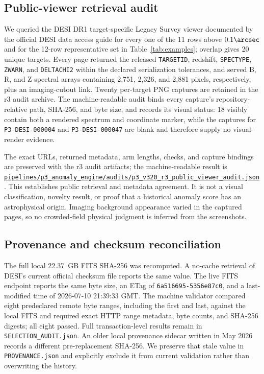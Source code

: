 \documentclass[twocolumn,linenumbers]{aastex702}
\newcommand{\repoBase}{https://github.com/Hubify-Projects/bigbounce/blob/main}
\newcommand{\artifact}[1]{\href{\repoBase/#1}{\nolinkurl{#1}}}
\begin{document}
\subsection{Public-viewer retrieval audit}\label{sec:viewer-audit}

We queried the DESI DR1 target-specific Legacy Survey viewer documented by the official DESI data
access guide for every one of the 11 rows above $0.1\arcsec$ and for the 12-row representative set
in Table~\ref{tab:examples}; overlap gives 20 unique targets.  Every page returned the released
\texttt{TARGETID}, redshift, \texttt{SPECTYPE}, \texttt{ZWARN}, and \texttt{DELTACHI2} within the
declared serialization tolerances, and served B, R, and Z spectral arrays containing 2,751,
2,326, and 2,881 pixels, respectively, plus an imaging-cutout link.  Twenty per-target PNG captures
are retained in the r3 audit archive.  The machine-readable audit binds every capture's repository-relative
path, SHA-256, and byte size, and records its visual status: 18 visibly contain both a rendered spectrum
and coordinate marker, while the captures for \texttt{P3-DESI-000004} and \texttt{P3-DESI-000047}
are blank and therefore supply no visual-render evidence.

The exact URLs, returned metadata, arm lengths, checks, and capture bindings are preserved with the r3
audit artifacts; the machine-readable result is
\artifact{pipelines/p3\_anomaly\_engine/audits/p3\_v320\_r3\_public\_viewer\_audit.json}.
This establishes public retrieval and metadata agreement.  It is not a visual classification,
novelty result, or proof that a historical anomaly score has an astrophysical origin.  Imaging
background appearance varied in the captured pages, so no crowded-field physical judgment is
inferred from the screenshots.

\subsection{Provenance and checksum reconciliation}\label{sec:checksums}

The full local 22.37~GB FITS SHA-256 was recomputed.  A no-cache retrieval of DESI's current
official checksum file reports the same value.  The live FITS endpoint reports the same byte size,
an ETag of \texttt{6a516695-5356e87c0}, and a last-modified time of 2026-07-10 21:39:33 GMT.  The
machine validator compared eight predeclared remote byte ranges, including the first and last,
against the local FITS and required exact HTTP range metadata, byte counts, and SHA-256 digests;
all eight passed.  Full transaction-level results remain in \texttt{SELECTION\_AUDIT.json}.  An older
local provenance sidecar written in May 2026 records a
different pre-replacement SHA-256.  We preserve that stale value in \texttt{PROVENANCE.json} and
explicitly exclude it from current validation rather than overwriting the history.
\end{document}
